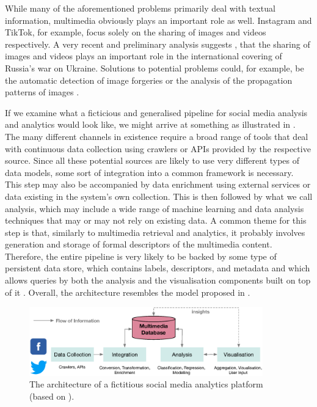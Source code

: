 While many of the aforementioned problems primarily deal with textual information, multimedia obviously plays an important role as well. Instagram and TikTok, for example, focus solely on the sharing of images and videos respectively. A very recent and preliminary analysis suggests \cite{Ciuriak:2022Role}, that the sharing of images and videos plays an important role in the international covering of Russia's war on Ukraine. Solutions to potential problems could, for example, be the automatic detection of image forgeries \cite{Farid:2009Image} or the analysis of the propagation patterns of images \cite{Zannettou:2018Origins}.

If we examine what a ficticious and generalised pipeline for social media analysis and analytics would look like, we might arrive at something as illustrated in . The many different channels in existence require a broad range of tools that deal with continuous data collection using crawlers or APIs provided by the respective source. Since all these potential sources are likely to use very different types of data models, some sort of integration into a common framework is necessary. This step may also be accompanied by data enrichment using external services or data existing in the system's own collection. This is then followed by what we call analysis, which may include a wide range of machine learning and data analysis techniques that may or may not rely on existing data. A common theme for this step is that, similarly to multimedia retrieval and analytics, it probably involves generation and storage of formal descriptors of the multimedia content. Therefore, the entire pipeline is very likely to be backed by some type of persistent data store, which contains labels, descriptors, and metadata and which allows queries by both the analysis and the visualisation components built on top of it \cite{Vrochidis:2019Big}. Overall, the architecture resembles the model proposed in \cite{Zahalka:2014Towards}. 

\begin{figure}[tb]
    \centering
    \includegraphics[width=0.90\textwidth]{figures/social-media-architecture.eps}
    \caption{The architecture of a fictitious social media analytics platform (based on \cite{Zhu2015:Multimedia,Cui:2019Defend,Yang:2019XFake,Bagade:2020Kauwa}).}
    \label{figure:social-media}
\end{figure}


